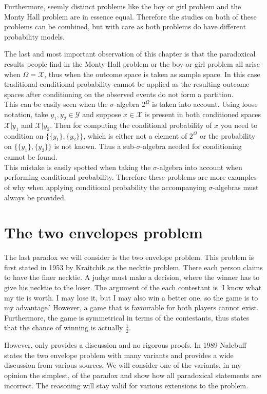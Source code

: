 \documentclass[a4paper]{report}
\theoremstyle{plain}
\theoremstyle{definition}
\theoremstyle{remark}
\numberwithin{equation}{chapter}
\DeclareMathOperator{\1}{\mathbbm{1}}
\newcommand{\X}{\mathcal{X}}
\newcommand{\Y}{\mathcal{Y}}
\begin{document}
Furthermore, seemly distinct problems like the boy or girl problem and the Monty Hall problem are in essence equal. Therefore the studies on both of these problems can be combined, but with care as both problems do have different probability models.

The last and most important observation of this chapter is that the paradoxical results people find in the Monty Hall problem or the boy or girl problem all arise when $\Omega=\X$, thus when the outcome space is taken as sample space. In this case traditional conditional probability cannot be applied as the resulting outcome spaces after conditioning on the observed events do not form a partition.\\
This can be easily seen when the $\sigma$-algebra $2^{\Omega}$ is taken into account. Using loose notation, take $y_1,y_2\in\Y$ and suppose $x\in\X$ is present in both conditioned spaces $\X|y_1$ and $\X|y_2$. Then for computing the conditional probability of $x$ you need to condition on $\{\{y_1\},\{y_2\}\}$, which is either not a element of $2^\Omega$ or the probability on $\{\{y_1\},\{y_2\}\}$ is not known. Thus a sub-$\sigma$-algebra needed for conditioning cannot be found.\\
This mistake is easily spotted when taking the $\sigma$-algebra into account when performing conditional probability. Therefore these problems are more examples of why when applying conditional probability the accompanying $\sigma$-algebras must always be provided.

\chapter{The two envelopes problem}\label{chap:TwoEnvelope}
The last paradox we will consider is the two envelope problem. This problem is first stated in 1953 by Kraitchik \cite{Kraitchik53} as the necktie problem. There each person claims to have the finer necktie. A judge must make a decision, where the winner has to give his necktie to the loser. The argument of the each contestant is `I know what my tie is worth. I may lose it, but I may also win a better one, so the game is to my advantage.' However, a game that is favourable for both players cannot exist. Furthermore, the game is symmetrical in terms of the contestants, thus \cite{Kraitchik53} states that the chance of winning is actually $\frac{1}{2}$.

However, \cite{Kraitchik53} only provides a discussion and no rigorous proofs. In 1989 Nalebuff \cite{Nalebuff89} states the two envelope problem with many variants and provides a wide discussion from various sources. We will consider one of the variants, in my opinion the simplest, of the paradox and show how all paradoxical statements are incorrect. The reasoning will stay valid for various extensions to the problem.
\end{document}
